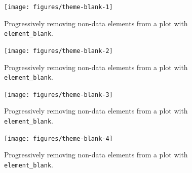 \begin{Shaded}
\begin{Highlighting}[]
\end{Highlighting}
\end{Shaded}

\begin{figure}
\texttt{[image: figures/theme-blank-1]} \caption{Progressively removing non-data elements from a plot with \texttt{element\_blank}.\label{fig:theme-blank1}}
\end{figure}

\begin{Shaded}
\begin{Highlighting}[]
\NormalTok{() +}\StringTok{ }\NormalTok{(} \NormalTok{())}
\end{Highlighting}
\end{Shaded}

\begin{figure}
\texttt{[image: figures/theme-blank-2]} \caption{Progressively removing non-data elements from a plot with \texttt{element\_blank}.\label{fig:theme-blank2}}
\end{figure}

\begin{Shaded}
\begin{Highlighting}[]
\NormalTok{() +}\StringTok{ }\NormalTok{(} \NormalTok{())}
\end{Highlighting}
\end{Shaded}

\begin{figure}
\texttt{[image: figures/theme-blank-3]} \caption{Progressively removing non-data elements from a plot with \texttt{element\_blank}.\label{fig:theme-blank3}}
\end{figure}

\begin{Shaded}
\begin{Highlighting}[]
\NormalTok{() +}\StringTok{ }\NormalTok{(} \NormalTok{())}
\end{Highlighting}
\end{Shaded}

\begin{figure}
\texttt{[image: figures/theme-blank-4]} \caption{Progressively removing non-data elements from a plot with \texttt{element\_blank}.\label{fig:theme-blank4}}
\end{figure}


